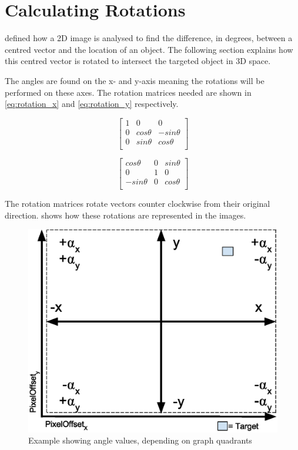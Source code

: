 \section{Calculating Rotations}
 defined how a 2D image is analysed to find the difference, in degrees, between a centred vector and the location of an object. The following section explains how this centred vector is rotated to intersect the targeted object in 3D space.

The angles are found on the x- and y-axis meaning the rotations will be performed on these axes. The rotation matrices needed are shown in \cref{eq:rotation_x} and \cref{eq:rotation_y} respectively.


\begin{equation}\label{eq:rotation_x}
\begin{bmatrix}
1 & 0 & 0 \\
0 & cos\theta & -sin\theta \\
0 & sin\theta & cos\theta \\
\end{bmatrix}
\end{equation}

\begin{equation}\label{eq:rotation_y}
\begin{bmatrix}
cos\theta  & 0 & sin\theta \\
0 & 1 & 0 \\
-sin\theta & 0 & cos\theta \\
\end{bmatrix}
\end{equation}

The rotation matrices rotate vectors counter clockwise from their original direction.  shows how these rotations are represented in the images.
\begin{figure}[H]
    \centering
    \includegraphics[scale=.65]{graphics/signed_angles.eps}
    \caption{Example showing angle values, depending on graph quadrants}
    \label{fig:signed_angles}
\end{figure}

